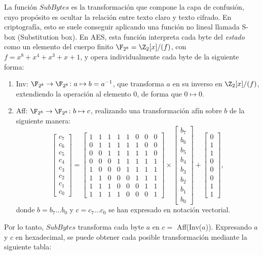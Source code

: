 La función $SubBytes$ es la transformación que compone la capa de confusión, cuyo propósito es ocultar la relación entre texto claro y texto cifrado. En criptografía, esto se suele conseguir aplicando una función no lineal llamada S-box (Substitution box). En AES, esta función interpreta cada byte del \textit{estado} como un elemento del cuerpo finito $\F_{2^8} = \Z_2[x]/(f)$, con $f = x^8 + x^4 + x^3 + x + 1$, y opera individualmente cada byte de la siguiente forma:
\begin{enumerate}[label={--}]
    \item Inv: $\F_{2^8} \to \F_{2^8} \colon a \mapsto b = a^{-1}$, que transforma $a$ en su inverso en $\Z_2[x]/(f)$, extendiendo la operación al elemento $0$, de forma que $ 0 \mapsto 0$.
    \item Aff: $\F_{2^8} \to \F_{2^8} \colon b \mapsto c$, realizando una transformación afín sobre $b$ de la siguiente manera:
\[
    \begin{bmatrix} 
    c_7 \\ c_6 \\ c_5 \\ c_4 \\ c_3 \\ c_2 \\ c_1 \\ c_0 
    \end{bmatrix} 
= 
    \begin{bmatrix} 
    1 & 1 & 1 & 1 & 1 & 0 & 0 & 0 \\ 
    0 & 1 & 1 & 1 & 1 & 1 & 0 & 0 \\ 
    0 & 0 & 1 & 1 & 1 & 1 & 1 & 0 \\ 
    0 & 0 & 0 & 1 & 1 & 1 & 1 & 1 \\
    1 & 0 & 0 & 0 & 1 & 1 & 1 & 1 \\ 
    1 & 1 & 0 & 0 & 0 & 1 & 1 & 1 \\ 
    1 & 1 & 1 & 0 & 0 & 0 & 1 & 1 \\ 
    1 & 1 & 1 & 1 & 0 & 0 & 0 & 1     
    \end{bmatrix} 
\times 
    \begin{bmatrix} 
    b_7 \\ b_6 \\ b_5 \\ b_4 \\ b_3 \\ b_2 \\ b_1 \\ b_0 
    \end{bmatrix} 
+ 
    \begin{bmatrix} 
    0 \\ 1 \\ 1 \\ 0 \\ 0 \\ 0 \\ 1 \\ 1 
    \end{bmatrix},
\]
donde $b = b_7\ldots b_0$ y $c =  c_7\ldots c_0$ se han expresado en notación vectorial.
\end{enumerate}
Por lo tanto, $SubBytes$ transforma cada byte $a$ en $c =$ Aff(Inv($a$)). Expresando $a$ y $c$ en hexadecimal, se puede obtener cada posible transformación mediante la siguiente tabla:

